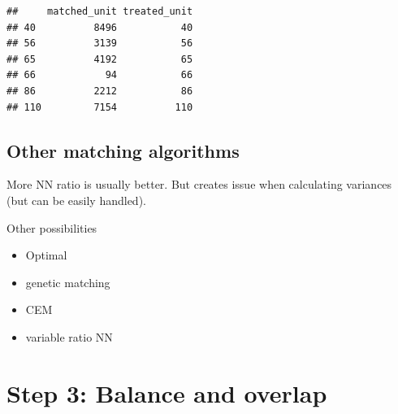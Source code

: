 \documentclass[
]{book}
\newenvironment{Shaded}{\begin{snugshade}}{\end{snugshade}}
\newcommand{\CommentTok}[1]{\textcolor[rgb]{0.56,0.35,0.01}{\textit{#1}}}
\newcommand{\FunctionTok}[1]{\textcolor[rgb]{0.00,0.00,0.00}{#1}}
\newcommand{\NormalTok}[1]{#1}
\newcommand{\OtherTok}[1]{\textcolor[rgb]{0.56,0.35,0.01}{#1}}
\newcommand{\SpecialCharTok}[1]{\textcolor[rgb]{0.00,0.00,0.00}{#1}}
\newcommand{\StringTok}[1]{\textcolor[rgb]{0.31,0.60,0.02}{#1}}
\providecommand{\tightlist}{%
  \setlength{\itemsep}{0pt}\setlength{\parskip}{0pt}}
\begin{document}
\begin{Shaded}
\end{Shaded}

\begin{verbatim}
##     matched_unit treated_unit
## 40          8496           40
## 56          3139           56
## 65          4192           65
## 66            94           66
## 86          2212           86
## 110         7154          110
\end{verbatim}

\hypertarget{other-matching-algorithms}{%
\section{Other matching algorithms}\label{other-matching-algorithms}}

More NN ratio is usually better. But creates issue when calculating variances (but can be easily handled).

Other possibilities

\begin{itemize}
\tightlist
\item
  Optimal
\item
  genetic matching
\item
  CEM
\item
  variable ratio NN
\end{itemize}

\hypertarget{s3}{%
\chapter{Step 3: Balance and overlap}\label{s3}}
\end{document}
